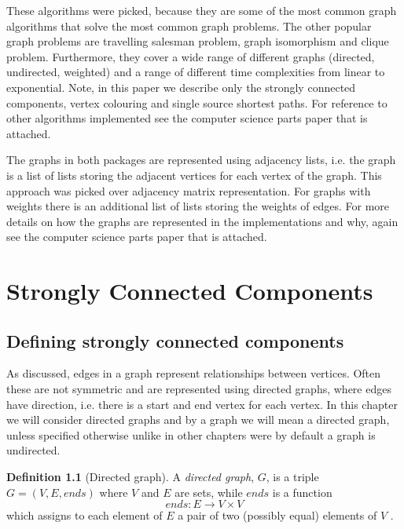 \documentclass{report}
\theoremstyle{plain}
\theoremstyle{definition}
\newtheorem{definition}{Definition}
\theoremstyle{remark}
\numberwithin{definition}{chapter}
\numberwithin{example}{chapter}
\numberwithin{figure}{chapter}
\numberwithin{theorem}{chapter}
\numberwithin{lemma}{chapter}
\begin{document}
These algorithms were picked, because they are some of the most common graph algorithms that solve the most common graph problems. The other popular graph problems are travelling salesman problem, graph isomorphism and clique problem. Furthermore, they cover a wide range of different graphs (directed, undirected, weighted) and a range of different time complexities from linear to exponential. Note, in this paper we describe only the strongly connected components, vertex colouring and single source shortest paths. For reference to other algorithms implemented see the computer science parts paper that is attached.

The graphs in both packages are represented using adjacency lists, i.e. the graph is a list of lists storing the adjacent vertices for each vertex of the graph. This approach was picked over adjacency matrix representation. For graphs with weights there is an additional list of lists storing the weights of edges. For more details on how the graphs are represented in the implementations and why, again see the computer science parts paper that is attached.

\chapter{Strongly Connected Components}

\section{Defining strongly connected components}

As discussed, edges in a graph represent relationships between vertices. Often these are not symmetric and are represented using directed graphs, where edges have direction, i.e. there is a start and end vertex for each vertex. In this chapter we will consider directed graphs and by a graph we will mean a directed graph, unless specified otherwise unlike in other chapters were by default a graph is undirected.

\begin{definition}[Directed graph]
A \emph{directed graph}, $G$, is a triple $G = (V, E, ends)$ where $V$ and $E$ are sets, while $ends$ is a function 
  \begin{equation}
  ends:E\to V \times V
  \end{equation}
which assigns to each element of $E$ a pair of two (possibly equal) elements of $V$ .
\end{definition}
\end{document}
